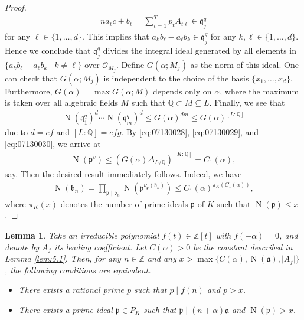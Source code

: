 \documentclass[a4paper,11pt]{amsart}
\newtheorem{lemma}[theorem]{Lemma}
\theoremstyle{definition}
\numberwithin{equation}{section}
\DeclareMathOperator{\norm}{N}
\begin{document}
\begin{proof}
\begin{align*}
na_\ell c+b_\ell
= \sum_{t=1}^{T} p_t A_{t \ell}
\in \mathfrak{q}_j^q
\end{align*}
for any $\ell \in \{1,\ldots,d\}$. 
This implies that $a_k b_\ell-a_\ell b_k \in \mathfrak{q}_j^q$ for any $k, \ell \in \{1,\ldots,d\}$. 
Hence we conclude that $\mathfrak{q}_j^q$ divides the integral ideal generated by all elements in $\{a_k b_\ell-a_\ell b_k \mid k \neq \ell\}$ over $\mathcal{O}_{M_j}$. 
Define $G(\alpha; M_j)$ as the norm of this ideal. 
One can check that $G(\alpha; M_j)$ is independent to the choice of the basis $\{x_1,\ldots,x_d\}$. 
Furthermore, $G(\alpha)=\max G(\alpha; M)$ depends only on $\alpha$, where the maximum is taken over all algebraic fields $M$ such that $\mathbb{Q} \subset M \subsetneq L$. 
Finally, we see that
\begin{align}\label{eq:07130030}
\norm(\mathfrak{q}_1^q)^{d} \cdots \norm(\mathfrak{q}_m^q)^{d}
\leq G(\alpha)^{dm}
\leq G(\alpha)^{[L:\mathbb{Q}]}
\end{align}
due to $d=ef$ and $[L:\mathbb{Q}]=efg$. 
By \eqref{eq:07130028}, \eqref{eq:07130029}, and \eqref{eq:07130030}, we arrive at
\begin{align*}
\norm(\mathfrak{p}^v)
\leq \left(G(\alpha) \Delta_{L/\mathbb{Q}}\right)^{[K:\mathbb{Q}]}
= C_1(\alpha), 
\end{align*}
say. 
Then the desired result immediately follows. 
Indeed, we have  
\begin{align*}
\norm(\mathfrak{b}_n)
= \prod_{\mathfrak{p} \mid \mathfrak{b}_n} \norm(\mathfrak{p}^{\nu_\mathfrak{p}(\mathfrak{b}_n)})
\leq C_1(\alpha)^{\pi_K(C_1(\alpha))}, 
\end{align*}
where $\pi_K(x)$ denotes the number of prime ideals $\mathfrak{p}$ of $K$ such that $\norm(\mathfrak{p}) \leq x$. 
\end{proof}

\begin{lemma}\label{lem:5.2}
Take an irreducible polynomial $f(t) \in \mathbb{Z}[t]$ with $f(-\alpha)=0$, and denote by $A_f$ its leading coefficient. 
Let $C(\alpha)>0$ be the constant described in Lemma \ref{lem:5.1}. 
Then, for any $n \in \mathbb{Z}$ and any $x>\max\{C(\alpha), \norm(\mathfrak{a}), |A_f|\}$, the following conditions are equivalent. 
\begin{itemize}
\item[$(\mathrm{A})$]
There exists a rational prime $p$ such that $p \mid f(n)$ and $p>x$. 
\item[$(\mathrm{B})$]
There exists a prime ideal $\mathfrak{p} \in P_K$ such that $\mathfrak{p} \mid (n+\alpha)\mathfrak{a}$ and $\norm(\mathfrak{p})>x$. 
\end{itemize}
\end{lemma}
\end{document}
